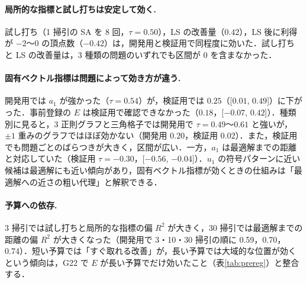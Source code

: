 \paragraph{局所的な指標と試し打ちは安定して効く.} 試し打ち（1 掃引の SA を 8 回，$\tau=0.50$），LS の改善量（$0.42$），LS 後に利得が $-2$〜$0$ の頂点数（$-0.42$）は，開発用と検証用で同程度に効いた．試し打ちと LS の改善量は，3 種類の問題のいずれでも区間が 0 を含まなかった．

\paragraph{固有ベクトル指標は問題によって効き方が違う.} 開発用では $a_1$ が強かった（$\tau=0.54$）が，検証用では $0.25$（[$0.01$, $0.49$]）に下がった．事前登録の $E$ は検証用で確認できなかった（$0.18$，[$-0.07$, $0.42$]）．種類別に見ると，3 正則グラフと三角格子では開発用で $\tau=0.49$〜$0.61$ と強いが，$\pm1$ 重みのグラフではほぼ効かない（開発用 $0.20$，検証用 $0.02$）．また，検証用でも問題ごとのばらつきが大きく，区間が広い．一方，$a_1$ は最適解までの距離と対応していた（検証用 $\tau=-0.30$，[$-0.56$, $-0.04$]）．$u_1$ の符号パターンに近い候補は最適解にも近い傾向があり，固有ベクトル指標が効くときの仕組みは「最適解への近さの粗い代理」と解釈できる．

\paragraph{予算への依存.} 3 掃引では試し打ちと局所的な指標の偏 $R^2$ が大きく，30 掃引では最適解までの距離の偏 $R^2$ が大きくなった（開発用で 3・10・30 掃引の順に 0.59，0.70，0.74）．短い予算では「すぐ取れる改善」が，長い予算では大域的な位置が効くという傾向は，G22 で $E$ が長い予算でだけ効いたこと（表\ref{tab:prereg}）と整合する．
